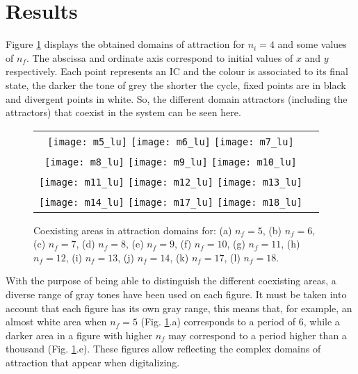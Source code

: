 \section{Results} \label{sec:results}

Figure \ref{fig:avvelo} displays the obtained domains of attraction for $n_i=4$ and some values of $n_f$. The abscissa and ordinate axis correspond to initial values of $x$ and $y$ respectively. Each point represents an IC and the colour is associated to its final state,  the darker the tone of grey the shorter the cycle, fixed points are in black and divergent points in white. So, the different domain attractors (including the attractors) that coexist in the system can be seen here.



\begin{figure}
  \centering
\begin{tabular}{cc}
\texttt{[image: m5\_lu]}
\texttt{[image: m6\_lu]}
\texttt{[image: m7\_lu]}\\
\texttt{[image: m8\_lu]}
\texttt{[image: m9\_lu]}
\texttt{[image: m10\_lu]}\\
\texttt{[image: m11\_lu]}
\texttt{[image: m12\_lu]}
\texttt{[image: m13\_lu]}\\
\texttt{[image: m14\_lu]}
\texttt{[image: m17\_lu]}
\texttt{[image: m18\_lu]}\\
\end{tabular}
\caption{Coexisting areas in attraction domains for: (a) $n_f=5$, (b) $n_f=6$, (c) $n_f=7$, (d) $n_f=8$, (e) $n_f=9$, (f) $n_f=10$, (g) $n_f=11$, (h) $n_f=12$, (i) $n_f=13$, (j) $n_f=14$, (k) $n_f=17$, (l) $n_f=18$.}
\label{fig:avvelo}
\end{figure}

With the purpose of being able to distinguish the different coexisting areas, a diverse range of gray tones have been used on each figure. It must be taken into account that each figure has its own gray range, this means that, for example, an almost white area when $n_f = 5$ (Fig. \ref{fig:avvelo}.a) corresponds to a period of $6$, while a darker area in a figure with higher $n_f$ may correspond to a period higher than a thousand (Fig. \ref{fig:avvelo}.e). These figures allow reflecting the  complex domains of attraction that appear when digitalizing.

